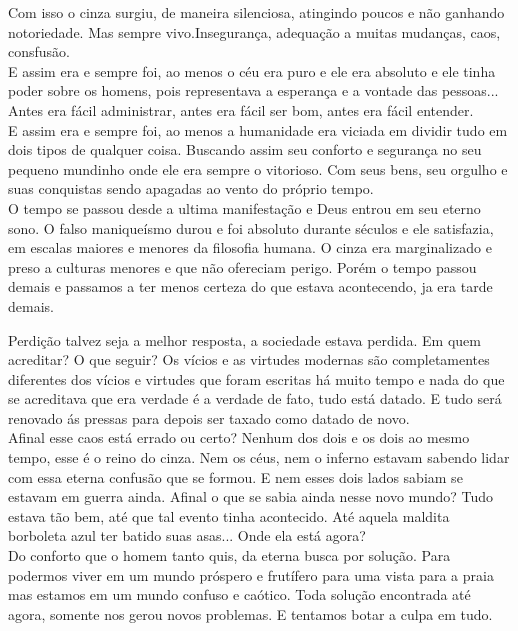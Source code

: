 \documentclass{book}
\begin{document}
Com isso o cinza surgiu, de maneira silenciosa, atingindo poucos e não ganhando notoriedade. Mas sempre vivo.Insegurança, adequação a muitas mudanças, caos, consfusão.\\

E assim era e sempre foi, ao menos o céu era puro e ele era absoluto e ele tinha poder sobre os homens, pois representava a esperança e a vontade das pessoas... Antes era fácil administrar, antes era fácil ser bom, antes era fácil entender.\\

E assim era e sempre foi, ao menos a humanidade era viciada em dividir tudo em dois tipos de qualquer coisa. Buscando assim seu conforto e segurança no seu pequeno mundinho onde ele era sempre o vitorioso. Com seus bens, seu orgulho e suas conquistas sendo apagadas ao vento do próprio tempo.\\

O tempo se passou desde a ultima manifestação e Deus entrou em seu eterno sono. O falso maniqueísmo durou e foi absoluto durante séculos e ele satisfazia, em escalas maiores e menores da filosofia humana. O cinza era marginalizado e preso a culturas menores e que não ofereciam perigo. Porém o tempo passou demais e passamos a ter menos certeza do que estava acontecendo, ja era tarde demais.

Perdição talvez seja a melhor resposta, a sociedade estava perdida. Em quem acreditar? O que seguir? Os vícios e as virtudes modernas são completamentes diferentes dos vícios e virtudes que foram escritas há muito tempo e nada do que se acreditava que era verdade é a verdade de fato, tudo está datado. E tudo será renovado ás pressas para depois ser taxado como datado de novo.\\

Afinal esse caos está errado ou certo? Nenhum dos dois e os dois ao mesmo tempo, esse é o reino do cinza. Nem os céus, nem o inferno estavam sabendo lidar com essa eterna confusão que se formou. E nem esses dois lados sabiam se estavam em guerra ainda. Afinal o que se sabia ainda nesse novo mundo? Tudo estava tão bem, até que tal evento tinha acontecido. Até aquela maldita borboleta azul ter batido suas asas... Onde ela está agora?  \\

Do conforto que o homem tanto quis, da eterna busca por solução. Para podermos viver em um mundo próspero e frutífero para uma vista para a praia mas estamos em um mundo confuso e caótico. Toda solução encontrada até agora, somente nos gerou novos problemas. E tentamos botar a culpa em tudo.
\end{document}
